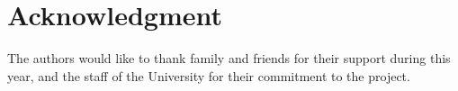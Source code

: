 \documentclass[conference]{IEEEtran}
\begin{document}


\section*{Acknowledgment}

The authors would like to thank family and friends for their support during this year, and the staff of the University for their commitment to the project.



%
%
%
 



\end{document}
